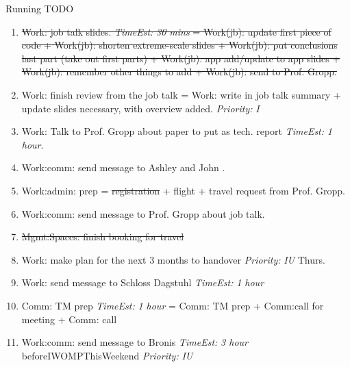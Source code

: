 \documentclass[serif, mathserif, final]{beamer}
\newcommand{\doneTaskNoItem}[1]{\sout{#1}}
\newcommand{\doneTask}[1]{\tiny \item \tiny \sout{#1}}
\newcommand{\te}[1]{\textit{TimeEst:} \textit{#1}}
\newcommand{\priority}[1]{\textit{Priority:} \textit{#1}}
\newcommand{\dl}[1]{#1}
\begin{document}
\begin{frame}{}
\begin{columns}
\begin{column}{0.50\linewidth}
\begin{block}{Running TODO}
\begin{enumerate}
      \doneTask{ Work: job talk slides. \te{30 mins} = Work(jb):
        update first piece of code  + Work(jb): shorten extreme-scale
        slides + Work(jb): put conclusions last part (take out first
        parts) + Work(jb): app add/update to app slides + Work(jb):
       remember other things to add + Work(jb): send to Prof. Gropp.}

    \item \small Work: finish review from the job talk  = Work:
      write in job talk summary + update slides necessary, with
      overview added. \priority{I} 
      
    \item \small Work: Talk to Prof. Gropp about paper to put as
      tech. report \te{1 hour}. 
        
    \item \small Work:comm: send message to Ashley and John . 
 
   \item \small Work:admin: prep = \doneTaskNoItem{registration} +
      flight + travel request from Prof. Gropp.  
    \item \small Work:comm: send message to Prof. Gropp about job
      talk. 

      \doneTask{Mgmt:Spaces: finish booking for travel} 

    \item \small Work: make plan for the next 3 months to handover
      \priority{IU} \dl{Thurs}.

    \item \small Work: send message to Schloss Dagstuhl \te{1 hour} 
    \item \small Comm: TM prep \te{1 hour} = Comm: TM prep + Comm:call
      for meeting + Comm: call


    \item \small Work:comm: send message to Bronis \te{3  hour} \dl
      {beforeIWOMPThisWeekend} \priority{IU}


\end{enumerate}
\end{block}
\end{column}
\end{columns}
\end{frame}
\end{document}
